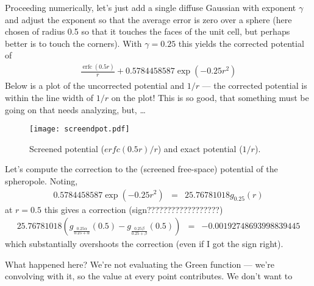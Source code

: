 \documentclass[12pt]{article}
\DeclareMathOperator{\erfc}{erfc}
\begin{document}
Proceeding numerically, let's just add a single diffuse Gaussian with exponent $\gamma$ and adjust the exponent so that the average error is zero over a sphere (here chosen of radius 0.5 so that it touches the faces of the unit cell, but perhaps better is to touch the corners).  With $\gamma=0.25$ this yields the corrected potential of
\begin{eqnarray}
 \frac{\erfc(0.5 r)}{r} + 0.5784458587 \exp(-0.25 r^2)
\end{eqnarray}
Below is a plot of the uncorrected potential and $1/r$ --- the corrected potential is within the line width of $1/r$ on the plot! This is so good, that something must be going on that needs analyzing, but, \ldots
\begin{figure}[hb]
\texttt{[image: screendpot.pdf]}  
  \caption{Screened potential ($erfc(0.5r)/r$) and exact potential ($1/r$).}
\end{figure}

Let's compute the correction to the (screened free-space) potential of the spheropole. Noting,
\begin{eqnarray}
  0.5784458587 \exp(-0.25 r^2) & = &  25.76781018 g_{0.25}(r) 
\end{eqnarray}
at $r=0.5$ this gives a correction (sign??????????????????)
\begin{eqnarray}
  25.76781018 \left( g_{\frac{0.25\alpha}{0.25+\alpha}}(0.5) - g_{\frac{0.25\beta}{0.25+\beta}}(0.5) \right)  & = & -0.00192748693998839445
\end{eqnarray}
which substantially overshoots the correction (even if I got the sign right).

What happened here?  We're not evaluating the Green function --- we're convolving with it, so the value at every point contributes.  We don't want to
\end{document}
